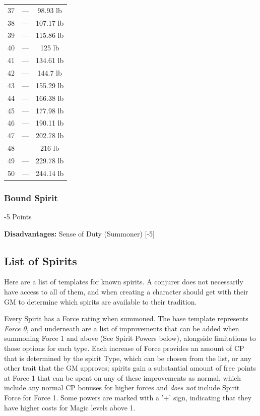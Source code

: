 \begin{multicols}{3}
\begin{center}
\begin{tabular}{|c|c|c|}
			37 & — & 98.93 lb \\
			38 & — & 107.17 lb \\
			39 & — & 115.86 lb \\
			40 & — & 125 lb \\
			41 & — & 134.61 lb \\
			42 & — & 144.7 lb \\
			43 & — & 155.29 lb \\
			44 & — & 166.38 lb \\
			45 & — & 177.98 lb \\
			46 & — & 190.11 lb \\
			47 & — & 202.78 lb \\
			48 & — & 216 lb \\
			49 & — & 229.78 lb \\
			50 & — & 244.14 lb \\
			\hline
		\end{tabular}
	\end{center}
	
	\subsubsection*{Bound Spirit}
	\begin{flushright}
		-5 Points
	\end{flushright}
	
	\textbf{Disadvantages:} Sense of Duty (Summoner) [-5]
	
	
	\subsection{List of Spirits}
	
	Here are a list of templates for known spirits. A conjurer does not necessarily have access to all of them, and when creating a character should get with their GM to determine which spirits are available to their tradition.
	
	Every Spirit has a Force rating when summoned. The base template represents \textit{Force 0}, and underneath are a list of improvements that can be added when summoning Force 1 and above (See Spirit Powers below), alongside limitations to those options for each type. Each increase of Force provides an amount of CP that is determined by the spirit Type, which can be chosen from the list, or any other trait that the GM approves; spirits gain a substantial amount of free points at Force 1 that can be spent on any of these improvements as normal, which include any normal CP bonuses for higher forces and \textit{does not} include Spirit Force for Force 1. Some powers are marked with a '+' sign, indicating that they have higher costs for Magic levels above 1.
	

\end{multicols}
